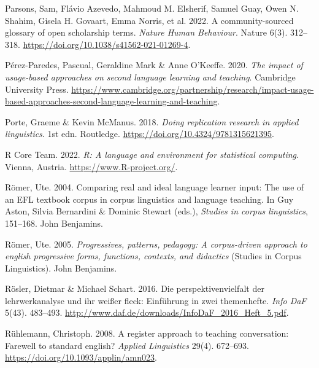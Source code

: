 \documentclass[
  letterpaper,
  DIV=11,
  numbers=noendperiod]{scrreprt}
\newlength{\cslhangindent}
\newenvironment{CSLReferences}[2] %
 {\begin{list}{}{%
  \setlength{\itemindent}{0pt}
  \setlength{\leftmargin}{0pt}
  \setlength{\parsep}{0pt}
  \ifodd #1
   \setlength{\leftmargin}{\cslhangindent}
   \setlength{\itemindent}{-1\cslhangindent}
  \fi
  \setlength{\itemsep}{#2\baselineskip}}}
 {\end{list}}
\begin{document}
\begin{CSLReferences}{1}{0}
Parsons, Sam, Flávio Azevedo, Mahmoud M. Elsherif, Samuel Guay, Owen N.
Shahim, Gisela H. Govaart, Emma Norris, et al. 2022. A community-sourced
glossary of open scholarship terms. \emph{Nature Human Behaviour}.
Nature 6(3). 312--318. \url{https://doi.org/10.1038/s41562-021-01269-4}.

Pérez-Paredes, Pascual, Geraldine Mark \& Anne O'Keeffe. 2020. \emph{The
impact of usage-based approaches on second language learning and
teaching}. Cambridge University Press.
\url{https://www.cambridge.org/partnership/research/impact-usage-based-approaches-second-language-learning-and-teaching}.

Porte, Graeme \& Kevin McManus. 2018. \emph{Doing replication research
in applied linguistics}. 1st edn. Routledge.
\url{https://doi.org/10.4324/9781315621395}.

R Core Team. 2022. \emph{R: A language and environment for statistical
computing}. Vienna, Austria. \url{https://www.R-project.org/}.

Römer, Ute. 2004. Comparing real and ideal language learner input: The
use of an EFL textbook corpus in corpus linguistics and language
teaching. In Guy Aston, Silvia Bernardini \& Dominic Stewart (eds.),
\emph{Studies in corpus linguistics}, 151--168. John Benjamins.

Römer, Ute. 2005. \emph{Progressives, patterns, pedagogy: A
corpus-driven approach to english progressive forms, functions,
contexts, and didactics} (Studies in Corpus Linguistics). John
Benjamins.

Rösler, Dietmar \& Michael Schart. 2016. Die perspektivenvielfalt der
lehrwerkanalyse und ihr weißer fleck: Einführung in zwei themenhefte.
\emph{Info DaF} 5(43). 483--493.
\url{http://www.daf.de/downloads/InfoDaF_2016_Heft_5.pdf}.

Rühlemann, Christoph. 2008. A register approach to teaching
conversation: Farewell to standard english? \emph{Applied Linguistics}
29(4). 672--693. \url{https://doi.org/10.1093/applin/amn023}.


\end{CSLReferences}
\end{document}
